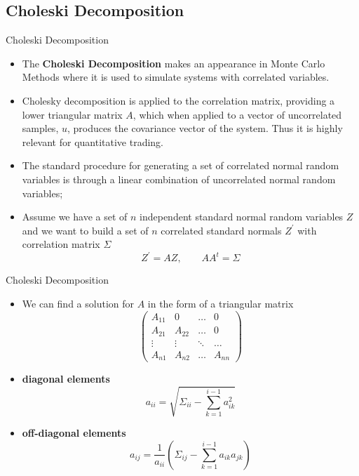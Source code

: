 \documentclass[11pt]{beamer}
\begin{document}
\subsection{Choleski Decomposition}
\begin{frame}{Choleski Decomposition}
\begin{itemize}
\item The \textbf{Choleski Decomposition} makes an appearance in Monte Carlo Methods where it is used to simulate systems with correlated variables. 
\item Cholesky decomposition is applied to the correlation matrix, providing a lower triangular matrix $A$, which when applied to a vector of uncorrelated samples, $u$, produces the covariance vector of the system. Thus it is highly relevant for quantitative trading.
\item The standard procedure for generating a set of correlated normal random variables is through a linear combination of uncorrelated normal random variables;
\item Assume we have a set of $n$ independent standard normal random variables $Z$ and we want to build a set of $n$ correlated standard normals $Z^\prime$ with correlation matrix $\Sigma$
$$
Z^\prime = AZ, \quad \quad AA^t = \Sigma
$$
\end{itemize}
\end{frame}
\begin{frame}{Choleski Decomposition}
\begin{itemize}
\item We can find a solution for $A$ in the form of a triangular matrix
$$
\begin{pmatrix} 
A_{11} & 0 & \dots & 0  \\ 
A_{21} & A_{22} & \dots & 0  \\ 
\vdots & \vdots & \ddots & \dots  \\ 
A_{n1} & A_{n2} & \dots & A_{nn}   
\end{pmatrix}
$$
\item \textbf{diagonal elements}
$$
a_{ii} = \sqrt{\Sigma_{ii} - \sum\limits_{k=1}^{i-1} a_{ik}^2}
$$
\item \textbf{off-diagonal elements}
$$
a_{ij} = \frac{1}{a_{ii}} \left( \Sigma_{ij} - \sum\limits_{k=1}^{i-1} a_{ik} a_{jk} \right)
$$
\end{itemize}
\end{frame}
\end{document}
